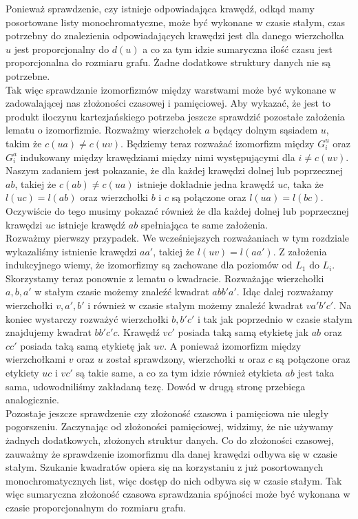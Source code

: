 \documentclass[12pt,a4paper,titlepage]{article}
\begin{document}
Ponieważ sprawdzenie, czy istnieje odpowiadająca krawędź, odkąd mamy posortowane listy monochromatyczne, może być wykonane w czasie stałym, czas potrzebny do znalezienia odpowiadających krawędzi jest dla danego wierzchołka $u$ jest proporcjonalny do $d(u)$ a co za tym idzie sumaryczna ilość czasu jest proporcjonalna do rozmiaru grafu. Żadne dodatkowe struktury danych nie są potrzebne. \\
Tak więc sprawdzanie izomorfizmów między warstwami może być wykonane w zadowalającej nas złożoności czasowej i pamięciowej. Aby wykazać, że jest to produkt iloczynu kartezjańskiego potrzeba jeszcze sprawdzić pozostałe założenia lematu o izomorfizmie. Rozważmy wierzchołek $a$ będący dolnym sąsiadem $u$, takim że $c(ua) \neq c(uv)$. Będziemy teraz rozważać izomorfizm między $G^u_i$ oraz $G^a_i$ indukowany między krawędziami między nimi występującymi dla $i \neq c(uv)$.\\
Naszym zadaniem jest pokazanie, że dla każdej krawędzi dolnej lub poprzecznej $ab$, takiej że $c(ab) \neq c(ua)$ istnieje dokładnie jedna krawędź $uc$, taka że $l(uc)=l(ab)$ oraz wierzchołki $b$ i $c$ są połączone oraz $l(ua)=l(bc)$. Oczywiście do tego musimy pokazać również że dla każdej dolnej lub poprzecznej krawędzi $uc$ istnieje krawędź $ab$ spełniająca te same założenia.\\
Rozważmy pierwszy przypadek. We wcześniejszych rozważaniach w tym rozdziale wykazaliśmy istnienie krawędzi $aa'$, takiej że $l(uv)=l(aa')$. Z założenia indukcyjnego wiemy, że izomorfizmy są zachowane dla poziomów od $L_1$ do $L_i$. Skorzystamy teraz ponownie z lematu o kwadracie. Rozważając wierzchołki $a,b,a'$ w stałym czasie możemy znaleźć kwadrat $abb'a'$. Idąc dalej rozważamy wierzchołki $v,a',b'$ i również w czasie stałym możemy znaleźć kwadrat $va'b'c'$. Na koniec wystarczy rozważyć wierzchołki $b,b'c'$ i tak jak poprzednio w czasie stałym znajdujemy kwadrat $bb'c'c$. Krawędź $vc'$ posiada taką samą etykietę jak $ab$ oraz $cc'$ posiada taką samą etykietę jak $uv$. A ponieważ izomorfizm między wierzchołkami $v$ oraz $u$ został sprawdzony, wierzchołki $u$ oraz $c$ są połączone oraz etykiety $uc$ i $vc'$ są takie same, a co za tym idzie również etykieta $ab$ jest taka sama, udowodniliśmy zakładaną tezę. Dowód w drugą stronę przebiega analogicznie.\\
Pozostaje jeszcze sprawdzenie czy złożoność czasowa i pamięciowa nie uległy pogorszeniu. Zaczynając od złożoności pamięciowej, widzimy, że nie używamy żadnych dodatkowych, złożonych struktur danych. Co do złożoności czasowej, zauważmy że sprawdzenie izomorfizmu dla danej krawędzi odbywa się w czasie stałym. Szukanie kwadratów opiera się na korzystaniu z już posortowanych monochromatycznych list, więc dostęp do nich odbywa się w czasie stałym. Tak więc sumaryczna złożoność czasowa sprawdzania spójności może być wykonana w czasie proporcjonalnym do rozmiaru grafu.\\
\newpage
\end{document}
